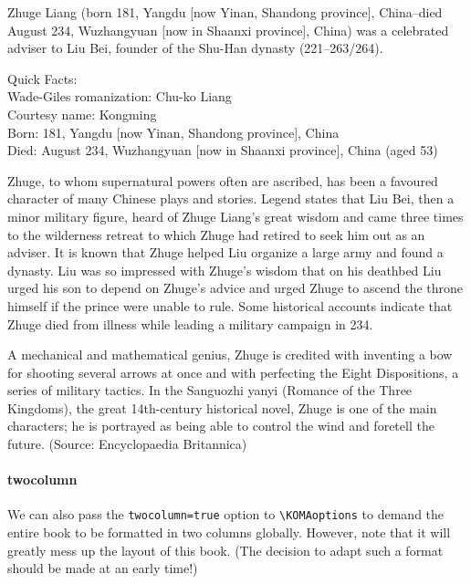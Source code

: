 \begin{multicols}{2}
Zhuge Liang (born 181, Yangdu [now Yinan, Shandong province], China--died August 234, Wuzhangyuan [now in Shaanxi province], China) was a celebrated adviser to Liu Bei, founder of the Shu-Han dynasty (221--263/264).

Quick Facts: \\
Wade-Giles romanization: Chu-ko Liang \\
Courtesy name: Kongming \\
Born: 181, Yangdu [now Yinan, Shandong province], China \\
Died: August 234, Wuzhangyuan [now in Shaanxi province], China (aged 53)

Zhuge, to whom supernatural powers often are ascribed, has been a favoured character of many Chinese plays and stories. Legend states that Liu Bei, then a minor military figure, heard of Zhuge Liang’s great wisdom and came three times to the wilderness retreat to which Zhuge had retired to seek him out as an adviser. It is known that Zhuge helped Liu organize a large army and found a dynasty. Liu was so impressed with Zhuge’s wisdom that on his deathbed Liu urged his son to depend on Zhuge’s advice and urged Zhuge to ascend the throne himself if the prince were unable to rule. Some historical accounts indicate that Zhuge died from illness while leading a military campaign in 234.

A mechanical and mathematical genius, Zhuge is credited with inventing a bow for shooting several arrows at once and with perfecting the Eight Dispositions, a series of military tactics. In the Sanguozhi yanyi (Romance of the Three Kingdoms), the great 14th-century historical novel, Zhuge is one of the main characters; he is portrayed as being able to control the wind and foretell the future. (Source: Encyclopaedia Britannica)
\end{multicols}


\paragraph{twocolumn} We can also pass the \verb|twocolumn=true| option to \texttt{\textbackslash KOMAoptions} to demand the entire book to be formatted in two columns globally. However, note that it will greatly mess up the layout of this book. (The decision to adapt such a format should be made at an early time!)